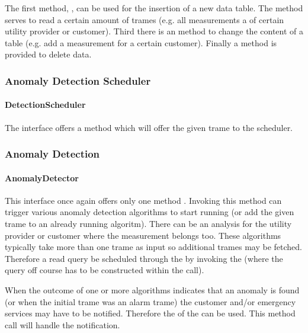 \npar The first method, , can be used for the insertion of
a new data table. The  method serves to read a certain
amount of trames (e.g. all measurements a of certain utility provider or
customer). Third there is an  method to change the
content of a table (e.g. add a measurement for a certain customer). Finally a
 method is provided to delete data.

\subsubsection{Anomaly Detection Scheduler}

\paragraph{DetectionScheduler}

\npar The  interface offers a
 method which will offer the given trame to the
scheduler.

\subsubsection{Anomaly Detection}

\paragraph{AnomalyDetector}

\npar This interface once again offers only one method .
Invoking this method can trigger various anomaly detection algorithms to start
running (or add the given trame to an already running algoritm). There can be an
analysis for the utility provider or customer where the measurement belongs too.
These algorithms typically take more than one trame as input so additional
trames may be fetched. Therefore a read query be scheduled through the
 by invoking the  (where
the query off course has to be constructed within the  call).

\npar When the outcome of one or more algorithms indicates that an anomaly is
found (or when the initial trame was an alarm trame) the customer and/or emergency
services may have to be notified. Therefore the 
of the  can be used. This method call will handle the
notification.


